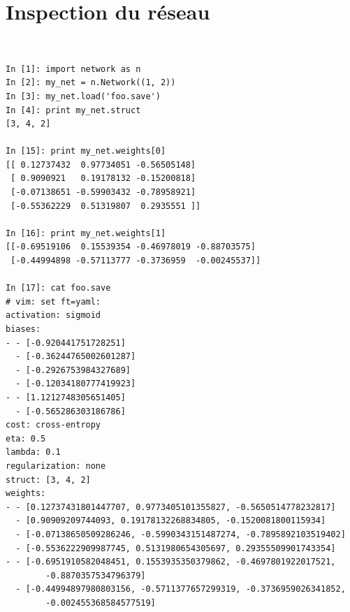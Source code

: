 \documentclass[11pt]{article}
\begin{document}
\section{Inspection du r\'eseau}
\label{inspect}
 \\
\begin{lstlisting}
In [1]: import network as n
In [2]: my_net = n.Network((1, 2))
In [3]: my_net.load('foo.save')
In [4]: print my_net.struct
[3, 4, 2]

In [15]: print my_net.weights[0]
[[ 0.12737432  0.97734051 -0.56505148]
 [ 0.9090921   0.19178132 -0.15200818]
 [-0.07138651 -0.59903432 -0.78958921]
 [-0.55362229  0.51319807  0.2935551 ]]

In [16]: print my_net.weights[1]
[[-0.69519106  0.15539354 -0.46978019 -0.88703575]
 [-0.44994898 -0.57113777 -0.3736959  -0.00245537]]

In [17]: cat foo.save
# vim: set ft=yaml:
activation: sigmoid
biases:
- - [-0.920441751728251]
  - [-0.36244765002601287]
  - [-0.2926753984327689]
  - [-0.12034180777419923]
- - [1.1212748305651405]
  - [-0.565286303186786]
cost: cross-entropy
eta: 0.5
lambda: 0.1
regularization: none
struct: [3, 4, 2]
weights:
- - [0.12737431801447707, 0.9773405101355827, -0.5650514778232817]
  - [0.90909209744093, 0.19178132268834805, -0.1520081800115934]
  - [-0.07138650509286246, -0.5990343151487274, -0.7895892103519402]
  - [-0.5536222909987745, 0.5131980654305697, 0.29355509901743354]
- - [-0.6951910582048451, 0.1553935350379862, -0.4697801922017521,
		-0.8870357534796379]
  - [-0.44994897980803156, -0.5711377657299319, -0.3736959026341852,
		-0.002455368584577519]
\end{lstlisting}
\end{document}
